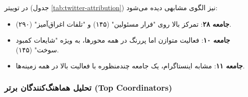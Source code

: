 \documentclass{article}
\begin{document}
\begin{table}[h!]
	\centering
	\caption{جدول تعلق جامعه - توییتر (بخشی از داده‌ها)}
	\label{tab:twitter-attribution}
\end{table}
	
	در توییتر (جدول \ref{tab:twitter-attribution}) نیز الگوی مشابهی دیده می‌شود:
	\begin{itemize}
		\item \textbf{جامعه ۲۸}: تمرکز بالا روی "فرار مسئولین" (۱۴۵) و "تلفات اغراق‌آمیز" (۲۹۰).
		\item \textbf{جامعه ۱۰}: فعالیت متوازن اما پررنگ در همه محورها، به ویژه "شایعات کمبود سوخت" (۱۴۵).
		\item \textbf{جامعه ۱۱}: مشابه اینستاگرام، یک جامعه چندمنظوره با فعالیت بالا در همه زمینه‌ها.
	\end{itemize}
	
	\subsubsection*{تحلیل هماهنگ‌کنندگان برتر (Top Coordinators)}
	
\end{document}
